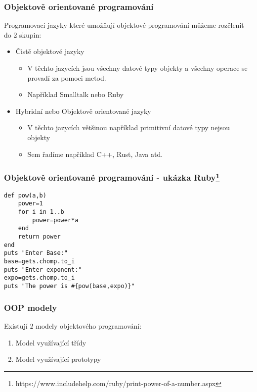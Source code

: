 \begin{frame}
    \frametitle{Objektově orientované programování} %
    Programovací jazyky které umožňují objektové programování můžeme rozčlenit do 2 skupin:

    \begin{itemize}
        \item Čistě objektové jazyky\begin{itemize}
            \item V těchto jazycích jsou všechny datové typy objekty a všechny operace se provadí za pomoci metod.
            \item Například Smalltalk nebo Ruby
        \end{itemize}
        \item  Hybridní nebo Objektově orientované jazyky\begin{itemize}
            \item V těchto jazycích většinou například primitivní datové typy nejsou objekty
            \item Sem řadíme například C++, Rust, Java atd. 
        \end{itemize}
    \end{itemize}
\end{frame}




\begin{frame}[fragile]
    \frametitle{Objektově orientované programování - ukázka Ruby\footnote{https://www.includehelp.com/ruby/print-power-of-a-number.aspx}}

\begin{lstlisting}[]
def pow(a,b)
    power=1
    for i in 1..b
        power=power*a
    end
    return power
end
puts "Enter Base:"
base=gets.chomp.to_i
puts "Enter exponent:"
expo=gets.chomp.to_i
puts "The power is #{pow(base,expo)}"  
\end{lstlisting}
\end{frame}

\begin{frame}
    \frametitle{OOP modely}
        Existují 2 modely objektového programování:
        \begin{enumerate}
            \item Model využívající třídy
            \item Model využívající prototypy
        \end{enumerate} 
\end{frame}

